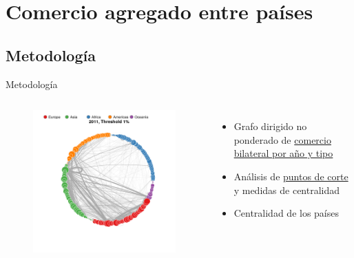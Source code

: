 \documentclass[compress]{beamer}
\begin{document}
\section{Comercio agregado entre países}

\subsection{Metodología}


\begin{frame}
\centering
\Large Metodología
\end{frame}



\begin{frame}
\begin{columns}[c] 

\begin{figure}
\includegraphics[width=1.4\linewidth]{grafo_Circ_2011_1_pcnt}
\end{figure}

\small

\begin{itemize}
	
	\item[\faRebel] Grafo dirigido no ponderado de \underline{comercio bilateral por año y tipo} 
	\item[\faRebel] Análisis de \underline{puntos de corte} y medidas de centralidad
	\item[\faRebel] Centralidad de los países
\end{itemize}


\end{columns}
\end{frame}
\end{document}
